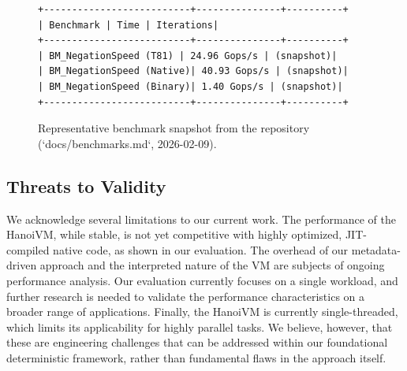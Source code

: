 \documentclass[sigconf, 10pt]{acmart}
\begin{document}
\begin{figure}[h]
\centering
\begin{lstlisting}
+--------------------------+---------------+----------+
| Benchmark | Time | Iterations|
+--------------------------+---------------+----------+
| BM_NegationSpeed (T81) | 24.96 Gops/s | (snapshot)|
| BM_NegationSpeed (Native)| 40.93 Gops/s | (snapshot)|
| BM_NegationSpeed (Binary)| 1.40 Gops/s | (snapshot)|
+--------------------------+---------------+----------+
\end{lstlisting}
\caption{Representative benchmark snapshot from the repository (`docs/benchmarks.md`, 2026-02-09).}
\label{fig:benchmark_screenshot}
\end{figure}
\subsection{Threats to Validity}
We acknowledge several limitations to our current work. The performance of the HanoiVM, while stable, is not yet competitive with highly optimized, JIT-compiled native code, as shown in our evaluation. The overhead of our metadata-driven approach and the interpreted nature of the VM are subjects of ongoing performance analysis. Our evaluation currently focuses on a single workload, and further research is needed to validate the performance characteristics on a broader range of applications. Finally, the HanoiVM is currently single-threaded, which limits its applicability for highly parallel tasks. We believe, however, that these are engineering challenges that can be addressed within our foundational deterministic framework, rather than fundamental flaws in the approach itself.
\end{document}
